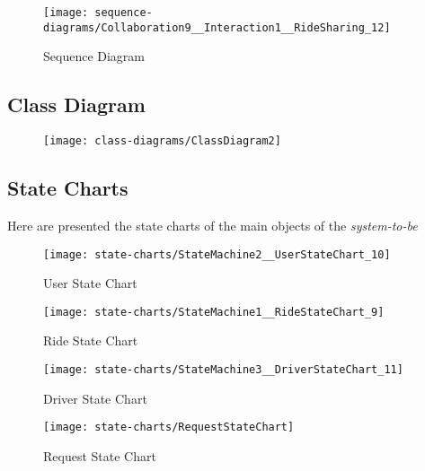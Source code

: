 \begin{figure}[h!t]
\caption{Sequence Diagram}
\texttt{[image: sequence-diagrams/Collaboration9\_\_Interaction1\_\_RideSharing\_12]}
\centering
\end{figure}

\newpage
\subsection{Class Diagram} 
\begin{figure}[h!t]
\texttt{[image: class-diagrams/ClassDiagram2]}
\centering
\end{figure}
\newpage

\subsection{State Charts} 
Here are presented the state charts of the main objects of the \emph{system-to-be}

\begin{figure}[h!]
\caption{User State Chart}
\texttt{[image: state-charts/StateMachine2\_\_UserStateChart\_10]}
\centering
\end{figure}

\newpage
\vfill
\begin{figure}
\caption{Ride State Chart}
\texttt{[image: state-charts/StateMachine1\_\_RideStateChart\_9]}
\centering
\end{figure}
\vfill
\clearpage


\newpage
\vfill
\begin{figure}
\caption{Driver State Chart}
\texttt{[image: state-charts/StateMachine3\_\_DriverStateChart\_11]}
\centering
\end{figure}
\vfill
\clearpage

\newpage
\vfill
\begin{figure}
\caption{Request State Chart}
\texttt{[image: state-charts/RequestStateChart]}
\centering
\end{figure}
\vfill
\clearpage
